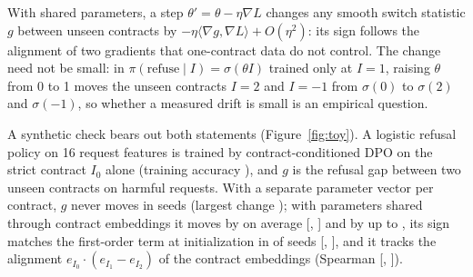 \documentclass[letterpaper]{article} %
\begin{document}
\noindent With shared parameters, a step $\theta'=\theta-\eta\nabla L$ changes any smooth switch statistic $g$ between unseen contracts by $-\eta\langle\nabla g,\nabla L\rangle+O(\eta^2)$: its sign follows the alignment of two gradients that one-contract data do not control. The change need not be small: in $\pi(\text{refuse}\mid I)=\sigma(\theta I)$ trained only at $I=1$, raising $\theta$ from 0 to 1 moves the unseen contracts $I=2$ and $I=-1$ from $\sigma(0)$ to $\sigma(2)$ and $\sigma(-1)$, so whether a measured drift is small is an empirical question.

\noindent A synthetic check bears out both statements (Figure~\ref{fig:toy}). A logistic refusal policy on 16 request features is trained by contract-conditioned DPO on the strict contract $I_0$ alone (training accuracy \nToyAcc{}), and $g$ is the refusal gap between two unseen contracts on harmful requests. With a separate parameter vector per contract, $g$ never moves in \nToySeeds{} seeds (largest change \nToyIndMax{}); with parameters shared through contract embeddings it moves by \nToyMeanChange{} on average [\nToyMeanChangeLo{}, \nToyMeanChangeHi{}] and by up to \nToyMaxChange{}, its sign matches the first-order term at initialization in \nToySignAgree{} of seeds [\nToySignAgreeLo{}, \nToySignAgreeHi{}], and it tracks the alignment $e_{I_0}\cdot(e_{I_1}-e_{I_2})$ of the contract embeddings (Spearman \nToyRho{} [\nToyRhoLo{}, \nToyRhoHi{}]).
\end{document}
